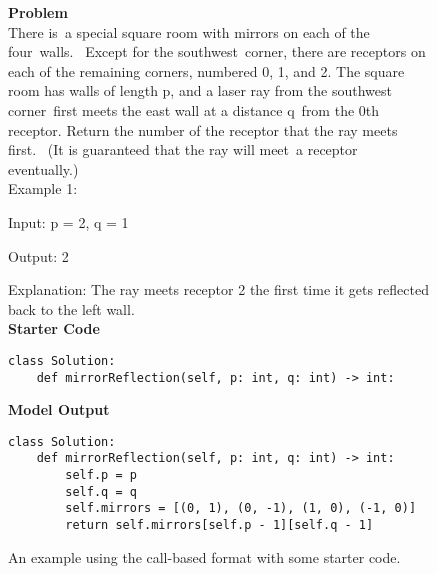 \documentclass{article}
\begin{document}
\begin{figure*}
    \textbf{Problem} \\
    There is a special square room with mirrors on each of the four walls.  Except for the southwest corner, there are receptors on each of the remaining corners, numbered 0, 1, and 2. The square room has walls of length p, and a laser ray from the southwest corner first meets the east wall at a distance q from the 0th receptor. Return the number of the receptor that the ray meets first.  (It is guaranteed that the ray will meet a receptor eventually.)
    \\
    
    Example 1:
    
    Input: p = 2, q = 1
    
    Output: 2
    
    Explanation: The ray meets receptor 2 the first time it gets reflected back to the left wall.
    \\

    \textbf{Starter Code}
    
    \begin{small}
\begin{verbatim}
class Solution:
    def mirrorReflection(self, p: int, q: int) -> int:
\end{verbatim}
\end{small}

 \textbf{Model Output}
 \begin{small}
\begin{verbatim}
class Solution:
    def mirrorReflection(self, p: int, q: int) -> int:
        self.p = p
        self.q = q
        self.mirrors = [(0, 1), (0, -1), (1, 0), (-1, 0)]
        return self.mirrors[self.p - 1][self.q - 1]
\end{verbatim}
\end{small}
    \caption{An example using the call-based format with some starter code.}
    \label{fig:supp_sample_3}
\end{figure*}
 
\end{document}
